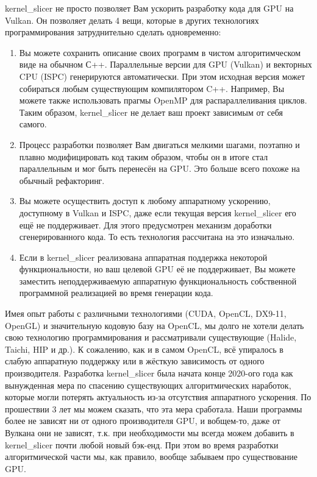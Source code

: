 \documentclass[11pt,fleqn,english,russian]{report} %
\begin{document}
kernel\_slicer не просто позволяет Вам ускорить разработку кода для GPU на Vulkan. Он позволяет делать 4 вещи, которые в других технологиях программирования затруднительно сделать одновременно:

\begin{enumerate}

\item Вы можете сохранить описание своих программ в чистом алгоритимческом виде на обычном С++. Параллельные версии для GPU (Vulkan) и векторных CPU (ISPC) генерируются автоматически. При этом исходная версия может собираться любым существующим компилятором C++. Например, Вы можете также использовать прагмы OpenMP для распараллеливания циклов. Таким образом, kernel\_slicer не делает ваш проект зависимым от себя самого.

\item Процесс разработки позволяет Вам двигаться мелкими шагами, поэтапно и плавно модифицировать код таким образом, чтобы он в итоге стал параллельным и мог быть перенесён на GPU. Это больше всего похоже на обычный рефакторинг.

\item Вы можете осуществить доступ к любому аппаратному ускорению, доступному в Vulkan и ISPC, даже если текущая версия kernel\_slicer его ещё не поддерживает. Для этого предусмотрен механизм доработки сгенерированного кода. То есть технология рассчитана на это изначально.

\item Если в kernel\_slicer реализована аппаратная поддержка некоторой функциональности, но ваш целевой GPU её не поддерживает, Вы можете заместить неподдерживаемую аппаратную функциональность собственной программной реализацией во время генерации кода.
\end{enumerate}

\begin{remark}Имея опыт работы с различными технологиями (CUDA, OpenCL, DX9-11, OpenGL) и значительную кодовую базу на OpenCL, мы долго не хотели делать свою технологию программирования и рассматривали существующие (Halide, Taichi, HIP и др.). К сожалению, как и в самом OpenCL, всё упиралось в слабую аппаратную поддержку или в жёсткую зависимость от одного производителя. Разработка kernel\_slicer была начата конце 2020-ого года как вынужденная мера по спасению существующих алгоритмических наработок, которые могли потерять актуальность из-за отсутствия аппаратного ускорения. По прошествии 3 лет мы можем сказать, что эта мера сработала. Наши программы более не зависят ни от одного производителя GPU, и вобщем-то, даже от Вулкана они не зависят, т.к. при необходимости мы всегда можем добавить в kernel\_slicer почти любой новый бэк-енд. При этом во время разработки алгоритмической части мы, как правило, вообще забываем про существование GPU.
\end{remark}
\end{document}
